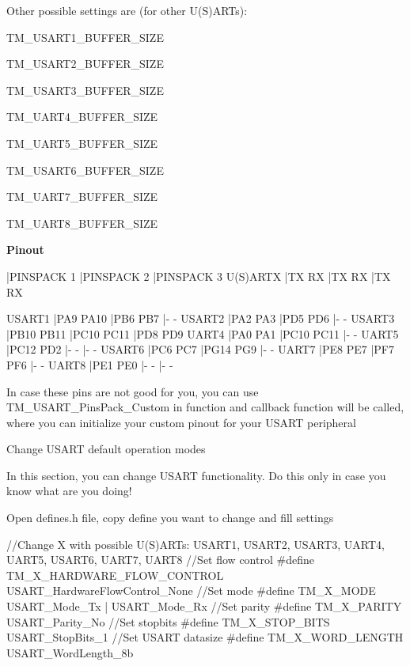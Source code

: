 Other possible settings are (for other U(\+S)A\+R\+Ts)\+:
\begin{DoxyItemize}
\item T\+M\+\_\+\+U\+S\+A\+R\+T1\+\_\+\+B\+U\+F\+F\+E\+R\+\_\+\+S\+I\+Z\+E
\item T\+M\+\_\+\+U\+S\+A\+R\+T2\+\_\+\+B\+U\+F\+F\+E\+R\+\_\+\+S\+I\+Z\+E
\item T\+M\+\_\+\+U\+S\+A\+R\+T3\+\_\+\+B\+U\+F\+F\+E\+R\+\_\+\+S\+I\+Z\+E
\item T\+M\+\_\+\+U\+A\+R\+T4\+\_\+\+B\+U\+F\+F\+E\+R\+\_\+\+S\+I\+Z\+E
\item T\+M\+\_\+\+U\+A\+R\+T5\+\_\+\+B\+U\+F\+F\+E\+R\+\_\+\+S\+I\+Z\+E
\item T\+M\+\_\+\+U\+S\+A\+R\+T6\+\_\+\+B\+U\+F\+F\+E\+R\+\_\+\+S\+I\+Z\+E
\item T\+M\+\_\+\+U\+A\+R\+T7\+\_\+\+B\+U\+F\+F\+E\+R\+\_\+\+S\+I\+Z\+E
\item T\+M\+\_\+\+U\+A\+R\+T8\+\_\+\+B\+U\+F\+F\+E\+R\+\_\+\+S\+I\+Z\+E
\end{DoxyItemize}

{\bfseries Pinout} \begin{DoxyVerb}             |PINSPACK 1     |PINSPACK 2     |PINSPACK 3    
U(S)ARTX     |TX     RX      |TX     RX      |TX     RX

USART1       |PA9    PA10    |PB6    PB7     |-      -
USART2       |PA2    PA3     |PD5    PD6     |-      -
USART3       |PB10   PB11    |PC10   PC11    |PD8    PD9
UART4        |PA0    PA1     |PC10   PC11    |-      -
UART5        |PC12   PD2     |-      -       |-      -
USART6       |PC6    PC7     |PG14   PG9     |-      -
UART7        |PE8    PE7     |PF7    PF6     |-      -
UART8        |PE1    PE0     |-      -       |-      -
\end{DoxyVerb}


In case these pins are not good for you, you can use T\+M\+\_\+\+U\+S\+A\+R\+T\+\_\+\+Pins\+Pack\+\_\+\+Custom in function and callback function will be called, where you can initialize your custom pinout for your U\+S\+A\+R\+T peripheral

\begin{DoxyParagraph}{Change U\+S\+A\+R\+T default operation modes}

\end{DoxyParagraph}
In this section, you can change U\+S\+A\+R\+T functionality. Do this only in case you know what are you doing!

Open defines.\+h file, copy define you want to change and fill settings \begin{DoxyVerb}//Change X with possible U(S)ARTs: USART1, USART2, USART3, UART4, UART5, USART6, UART7, UART8
//Set flow control
#define TM_X_HARDWARE_FLOW_CONTROL      USART_HardwareFlowControl_None
//Set mode
#define TM_X_MODE                       USART_Mode_Tx | USART_Mode_Rx
//Set parity
#define TM_X_PARITY                     USART_Parity_No
//Set stopbits
#define TM_X_STOP_BITS                  USART_StopBits_1
//Set USART datasize
#define TM_X_WORD_LENGTH                USART_WordLength_8b
\end{DoxyVerb}


